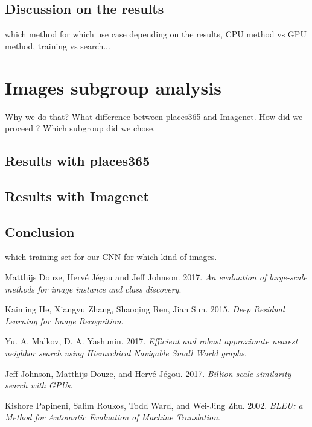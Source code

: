 \documentclass[a4paper]{article}
\begin{document}
\subsection{Discussion on the results}
	which method for which use case depending on the results, CPU method vs GPU method, training vs search...

\section{Images subgroup analysis}
	Why we do that? What difference between places365 and Imagenet. How did we proceed ? Which subgroup did we chose.
	
	\subsection{Results with places365}
	\subsection{Results with Imagenet}
	\subsection{Conclusion}
	
	which training set for our CNN for which kind of images.

\begin{thebibliography}{5}

Matthijs Douze, Hervé Jégou and Jeff Johnson. 2017.
\textit{An evaluation of large-scale methods for image instance and class discovery}.

Kaiming He, Xiangyu Zhang, Shaoqing Ren, Jian Sun. 2015.
\textit{Deep Residual Learning for Image Recognition}.

Yu. A. Malkov, D. A. Yashunin. 2017.
\textit{Efficient and robust approximate nearest neighbor search using Hierarchical Navigable Small World graphs}.

Jeff Johnson, Matthijs Douze, and Hervé Jégou. 2017.
\textit{Billion-scale similarity search with GPUs}. 

Kishore Papineni, Salim Roukos, Todd Ward, and Wei-Jing Zhu. 2002.
\textit{BLEU: a Method for Automatic Evaluation of Machine Translation}. 


\end{thebibliography}
\end{document}
